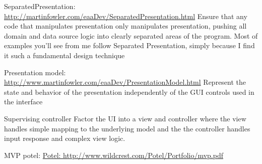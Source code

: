 SeparatedPresentation:
\url{http://martinfowler.com/eaaDev/SeparatedPresentation.html}
Ensure that any code that manipulates presentation only manipulates presentation, pushing all domain and data source logic into clearly separated areas of the program.
Most of examples you'll see from me follow Separated Presentation, simply because I find it such a fundamental design technique

Presentation model:
\url{http://www.martinfowler.com/eaaDev/PresentationModel.html}
Represent the state and behavior of the presentation independently of the GUI controls used in the interface

Supervising controller
Factor the UI into a view and controller where the view handles simple mapping to the underlying model and the the controller handles input response and complex view logic.

MVP potel:
\url{Potel: http://www.wildcrest.com/Potel/Portfolio/mvp.pdf}